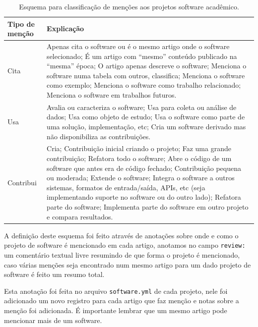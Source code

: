 \begin{table}[h]
\caption{Esquema para classificação de menções aos projetos software acadêmico.}
\centering
\begin{tabular}{ l p{10cm} }
  \hline
  Tipo de menção           & Explicação \\
  \hline
  Cita      & Apenas cita o software ou é o mesmo artigo onde o software selecionado; É um artigo com ``mesmo'' conteúdo publicado na ``mesma'' época; O artigo apenas descreve o software; Menciona o software numa tabela com outros, classifica; Menciona o software como exemplo; Menciona o software como trabalho relacionado; Menciona o software em trabalhos futuros. \\
  Usa       & Avalia ou caracteriza o software; Usa para coleta ou análise de dados; Usa como objeto de estudo; Usa o software como parte de uma solução, implementação, etc; Cria um software derivado mas não disponibiliza as contribuições. \\
  Contribui & Cria; Contribuição inicial criando o projeto; Faz uma grande contribuição; Refatora todo o software; Abre o código de um software que antes era de código fechado; Contribuição pequena ou moderada; Extende o software; Integra o software a outros sistemas, formatos de entrada/saída, APIs, etc (seja implementando suporte no software ou do outro lado); Refatora parte do software; Implementa parte do software em outro projeto e compara resultados. \\
  \hline
\end{tabular}
\label{esquema-de-mencao}
\end{table}

A definição deste esquema foi feito através de anotações sobre onde
e como o projeto de software é mencionado em cada artigo, anotamos no campo
\texttt{review:} um comentário textual livre resumindo de que forma o projeto
é mencionado, caso várias menções seja encontrado num mesmo artigo para um dado
projeto de software é feito um resumo total.

Esta anotação foi feita no arquivo \texttt{software.yml} de cada projeto, nele
foi adicionado um novo registro para cada artigo que faz menção e notas sobre a
menção foi adicionada. É importante lembrar que um mesmo artigo pode mencionar
mais de um software.


